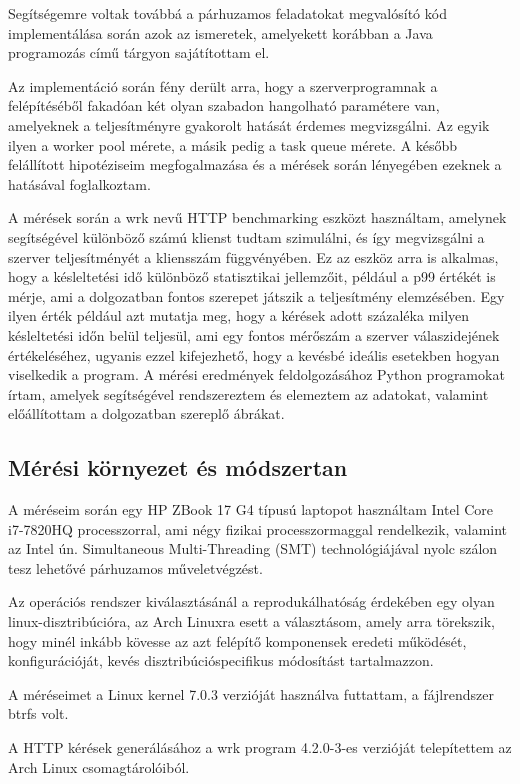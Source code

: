 \documentclass[11pt,a4paper]{article}
\begin{document}
Segítségemre voltak továbbá a párhuzamos feladatokat megvalósító kód implementálása során azok az ismeretek,
amelyekett korábban a Java programozás című tárgyon sajátítottam el.

Az implementáció során fény derült arra, hogy a szerverprogramnak a felépítéséből fakadóan két olyan szabadon
hangolható paramétere van, amelyeknek a teljesítményre gyakorolt hatását érdemes megvizsgálni. Az egyik ilyen a worker pool mérete,
a másik pedig a task queue mérete. A később felállított hipotéziseim megfogalmazása és a mérések során
lényegében ezeknek a hatásával foglalkoztam. 

A mérések során a wrk nevű HTTP benchmarking eszközt használtam, amelynek segítségével különböző számú klienst tudtam szimulálni, 
és így megvizsgálni a szerver teljesítményét a kliensszám függvényében. 
Ez az eszköz arra is alkalmas, hogy a késleltetési idő különböző statisztikai jellemzőit, például a p99 értékét is mérje, ami a dolgozatban fontos szerepet játszik a teljesítmény elemzésében.
Egy ilyen érték például azt mutatja meg, hogy a kérések adott százaléka milyen késleltetési időn belül teljesül, ami egy fontos mérőszám a szerver válaszidejének értékeléséhez,
ugyanis ezzel kifejezhető, hogy a kevésbé ideális esetekben hogyan viselkedik a program.
A mérési eredmények feldolgozásához Python programokat írtam, 
amelyek segítségével rendszereztem és elemeztem az adatokat, valamint előállítottam a dolgozatban szereplő ábrákat.

\subsection{Mérési környezet és módszertan}
\label{ssec:kornyezet}

A méréseim során egy HP ZBook 17 G4 típusú laptopot használtam
Intel Core i7-7820HQ processzorral, ami négy fizikai processzormaggal rendelkezik,
valamint az Intel ún. Simultaneous Multi-Threading (SMT) technológiájával nyolc szálon
tesz lehetővé párhuzamos műveletvégzést.

Az operációs rendszer kiválasztásánál a reprodukálhatóság érdekében egy olyan linux-disztribúcióra,
az Arch Linuxra esett a választásom, amely arra törekszik, hogy minél inkább kövesse az azt felépítő komponensek
eredeti működését, konfigurációját, kevés disztribúcióspecifikus módosítást tartalmazzon.

A méréseimet a Linux kernel 7.0.3 verzióját használva futtattam, a fájlrendszer btrfs volt.

A HTTP kérések generálásához a wrk program 4.2.0-3-es verzióját telepítettem az Arch Linux csomagtárolóiból.
\end{document}
